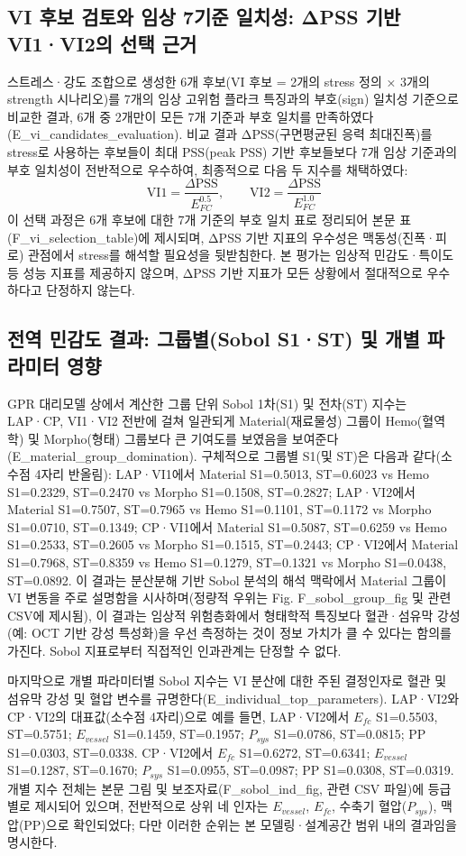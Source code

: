 \documentclass[preprint,12pt]{elsarticle}
\begin{document}
\subsection{VI 후보 검토와 임상 7기준 일치성: ΔPSS 기반 VI1·VI2의 선택 근거}
스트레스·강도 조합으로 생성한 6개 후보(VI 후보 = 2개의 stress 정의 × 3개의 strength 시나리오)를 7개의 임상 고위험 플라크 특징과의 부호(sign) 일치성 기준으로 비교한 결과, 6개 중 2개만이 모든 7개 기준과 부호 일치를 만족하였다(E\_vi\_candidates\_evaluation). 비교 결과 ΔPSS(구면평균된 응력 최대진폭)를 stress로 사용하는 후보들이 최대 PSS(peak PSS) 기반 후보들보다 7개 임상 기준과의 부호 일치성이 전반적으로 우수하여, 최종적으로 다음 두 지수를 채택하였다: $$\mathrm{VI1}=\dfrac{\Delta\mathrm{PSS}}{E_{FC}^{0.5}},\qquad \mathrm{VI2}=\dfrac{\Delta\mathrm{PSS}}{E_{FC}^{1.0}} \tag{1}$$ 이 선택 과정은 6개 후보에 대한 7개 기준의 부호 일치 표로 정리되어 본문 표(F\_vi\_selection\_table)에 제시되며, ΔPSS 기반 지표의 우수성은 맥동성(진폭·피로) 관점에서 stress를 해석할 필요성을 뒷받침한다. 본 평가는 임상적 민감도·특이도 등 성능 지표를 제공하지 않으며, ΔPSS 기반 지표가 모든 상황에서 절대적으로 우수하다고 단정하지 않는다.

\subsection{전역 민감도 결과: 그룹별(Sobol S1·ST) 및 개별 파라미터 영향}
GPR 대리모델 상에서 계산한 그룹 단위 Sobol 1차(S1) 및 전차(ST) 지수는 LAP·CP, VI1·VI2 전반에 걸쳐 일관되게 Material(재료물성) 그룹이 Hemo(혈역학) 및 Morpho(형태) 그룹보다 큰 기여도를 보였음을 보여준다(E\_material\_group\_domination). 구체적으로 그룹별 S1(및 ST)은 다음과 같다(소수점 4자리 반올림): LAP·VI1에서 Material S1=0.5013, ST=0.6023 vs Hemo S1=0.2329, ST=0.2470 vs Morpho S1=0.1508, ST=0.2827; LAP·VI2에서 Material S1=0.7507, ST=0.7965 vs Hemo S1=0.1101, ST=0.1172 vs Morpho S1=0.0710, ST=0.1349; CP·VI1에서 Material S1=0.5087, ST=0.6259 vs Hemo S1=0.2533, ST=0.2605 vs Morpho S1=0.1515, ST=0.2443; CP·VI2에서 Material S1=0.7968, ST=0.8359 vs Hemo S1=0.1279, ST=0.1321 vs Morpho S1=0.0438, ST=0.0892. 이 결과는 분산분해 기반 Sobol 분석의 해석 맥락에서 Material 그룹이 VI 변동을 주로 설명함을 시사하며(정량적 우위는 Fig. F\_sobol\_group\_fig 및 관련 CSV에 제시됨), 이 결과는 임상적 위험층화에서 형태학적 특징보다 혈관·섬유막 강성(예: OCT 기반 강성 특성화)을 우선 측정하는 것이 정보 가치가 클 수 있다는 함의를 가진다. Sobol 지표로부터 직접적인 인과관계는 단정할 수 없다.

마지막으로 개별 파라미터별 Sobol 지수는 VI 분산에 대한 주된 결정인자로 혈관 및 섬유막 강성 및 혈압 변수를 규명한다(E\_individual\_top\_parameters). LAP·VI2와 CP·VI2의 대표값(소수점 4자리)으로 예를 들면, LAP·VI2에서 $E_{fc}$ S1=0.5503, ST=0.5751; $E_{vessel}$ S1=0.1459, ST=0.1957; $P_{sys}$ S1=0.0786, ST=0.0815; PP S1=0.0303, ST=0.0338. CP·VI2에서 $E_{fc}$ S1=0.6272, ST=0.6341; $E_{vessel}$ S1=0.1287, ST=0.1670; $P_{sys}$ S1=0.0955, ST=0.0987; PP S1=0.0308, ST=0.0319. 개별 지수 전체는 본문 그림 및 보조자료(F\_sobol\_ind\_fig, 관련 CSV 파일)에 등급별로 제시되어 있으며, 전반적으로 상위 네 인자는 $E_{vessel}$, $E_{fc}$, 수축기 혈압($P_{sys}$), 맥압(PP)으로 확인되었다; 다만 이러한 순위는 본 모델링·설계공간 범위 내의 결과임을 명시한다.
\end{document}
